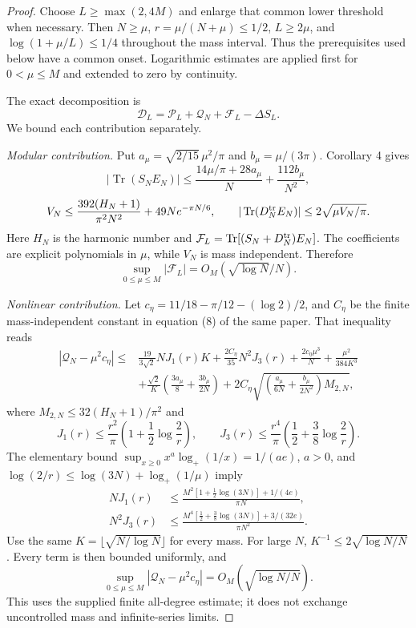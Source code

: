 \begin{proof}
Choose $L\ge\max(2,4M)$ and enlarge that common lower threshold when necessary. Then $N\ge\mu$, $r=\mu/(N+\mu)\le1/2$, $L\ge2\mu$, and $\log(1+\mu/L)\le1/4$ throughout the mass interval. Thus the prerequisites used below have a common onset. Logarithmic estimates are applied first for $0<\mu\le M$ and extended to zero by continuity.

The exact decomposition is
\[
\mathcal D_L=\mathcal P_L+\mathcal Q_N+\mathcal F_L-\Delta S_L.
\]
We bound each contribution separately.

\emph{Modular contribution.} Put $a_\mu=\sqrt{2/15}\,\mu^2/\pi$ and $b_\mu=\mu/(3\pi)$. Corollary 4 gives
\[
|\operatorname{Tr}(S_NE_N)|\le
\frac{14\mu/\pi+28a_\mu}{N}+\frac{112b_\mu}{N^2},
\]
\[
V_N\le\frac{392(H_N+1)}{\pi^2N^2}+49Ne^{-\pi N/6},\qquad
|\operatorname{Tr}(D_N^{\rm tr}E_N)|\le2\sqrt{\mu V_N/\pi}.
\]
Here $H_N$ is the harmonic number and $\mathcal F_L=\operatorname{Tr}[(S_N+D_N^{\rm tr})E_N]$. The coefficients are explicit polynomials in $\mu$, while $V_N$ is mass independent. Therefore
\[
\sup_{0\le\mu\le M}|\mathcal F_L|=O_M(\sqrt{\log N}/N).
\]

\emph{Nonlinear contribution.} Let $c_\eta=11/18-\pi/12-(\log2)/2$, and $C_\eta$ be the finite mass-independent constant in equation (8) of the same paper. That inequality reads
\begin{align*}
|\mathcal Q_N-\mu^2c_\eta|\le{}&
\frac{19}{3\sqrt2}NJ_1(r)K+\frac{2C_\eta}{35}N^2J_3(r)
+\frac{2c_\eta\mu^3}{N}+\frac{\mu^2}{384K^3}\\
&+\frac{\sqrt2}{K}\left(\frac{3a_\mu}{8}+\frac{3b_\mu}{2N}\right)
+2C_\eta\sqrt{\left(\frac{a_\mu}{6N}+\frac{b_\mu}{2N^2}\right)M_{2,N}},
\end{align*}
where $M_{2,N}\le32(H_N+1)/\pi^2$ and
\[
J_1(r)\le\frac{r^2}{\pi}\left(1+\frac12\log\frac2r\right),\qquad
J_3(r)\le\frac{r^4}{\pi}\left(\frac12+\frac38\log\frac2r\right).
\]
The elementary bound $\sup_{x\ge0}x^a\log_+(1/x)=1/(ae)$, $a>0$, and $\log(2/r)\le\log(3N)+\log_+(1/\mu)$ imply
\begin{align*}
NJ_1(r)&\le\frac{M^2[1+\tfrac12\log(3N)]+1/(4e)}{\pi N},\\
N^2J_3(r)&\le\frac{M^4[\tfrac12+\tfrac38\log(3N)]+3/(32e)}{\pi N^2}.
\end{align*}
Use the same $K=\lfloor\sqrt{N/\log N}\rfloor$ for every mass. For large $N$, $K^{-1}\le2\sqrt{\log N/N}$. Every term is then bounded uniformly, and
\[
\sup_{0\le\mu\le M}|\mathcal Q_N-\mu^2c_\eta|
=O_M(\sqrt{\log N/N}).
\]
This uses the supplied finite all-degree estimate; it does not exchange uncontrolled mass and infinite-series limits.


\end{proof}
